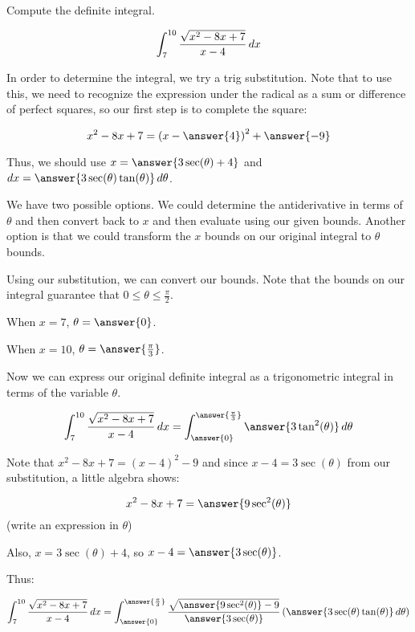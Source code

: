 \documentclass{ximera}
\author{Jim Talamo and Jason Miller}
\begin{document}
\begin{exercise}
Compute the definite integral. 

\[
\int_{7}^{10} \frac{\sqrt{x^{2}-8x+7}}{x-4} \mathop{}\!d x
\]



In order to determine the integral, we try a trig substitution.  Note that to use this, we need to recognize the expression under the radical as a sum or difference of perfect squares, so our first step is to complete the square:

\[
x^2-8x+7 = \left(x - \answer{4}\right)^2+\answer{-9}
\]

\begin{exercise}
Thus, we should use $x=\answer{3\sec(\theta)+4}$ and $\d x= \answer{ 3\sec(\theta)\tan(\theta)} \d \theta$. 

We have two possible options. We could determine the antiderivative in terms of $\theta$ 
and then convert back to $x$ and then evaluate using our given bounds. 
Another option is that we could transform the $x$ bounds on our original integral to $\theta$ bounds. 

Using our substitution, we can convert our bounds. Note that the bounds on our integral guarantee that $0\leq \theta \leq \frac{\pi}{2}$. 

When $x=7$, $\theta=\answer{0}$. 

When $x=10$, $\theta=\answer{\frac{\pi}{3}}$. 



\begin{exercise}


Now we can express our original definite integral as a trigonometric integral in terms of the variable $\theta$. 

\[
\int_{7}^{10} \frac{\sqrt{x^{2}-8x+7}}{x-4}  \d x= \int_{\answer{0}}^{\answer{\frac{\pi}{3}}}  \answer{3\tan^{2}(\theta)}   \d \theta
\]

\begin{hint}
Note that $x^2-8x+7 = (x-4)^2-9$ and since $x-4 = 3 \sec(\theta)$ from our substitution, a little algebra shows:

\[x^2-8x+7 = \answer{9 \sec^2(\theta)}\]
(write an expression in $\theta$)

Also, $x = 3 \sec(\theta)+4$, so $x-4=\answer{3\sec(\theta)}$.

Thus:

\[
\int_{7}^{10} \frac{\sqrt{x^{2}-8x+7}}{x-4}  \d x = \int_{\answer{0}}^{\answer{\frac{\pi}{3}}}  \frac{\sqrt{\answer{9 \sec^2(\theta)}-9}}{\answer{3\sec(\theta)}}  \left(\answer{3 \sec(\theta)\tan(\theta)}   \d \theta\right)
\]


\end{hint}
\end{exercise}
\end{exercise}
\end{exercise}
\end{document}

